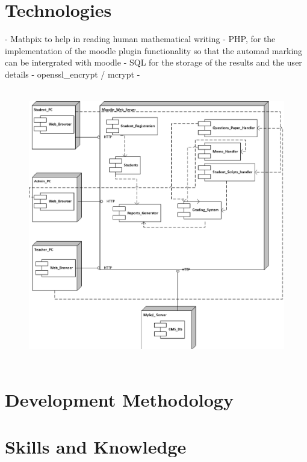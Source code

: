 \documentclass{article}
\begin{document}
\section{Technologies}
  - Mathpix to help in reading human mathematical writing 
  - PHP, for the implementation of the moodle plugin functionality so that the automad marking can be intergrated with moodle
  - SQL for the storage of the results and the user details
  - openssl_encrypt / mcrypt
  - 
\begin{figure}[h]
\centering
\includegraphics[width=12cm, height=12cm]{Caracal_Deployment_Diagram.eps} 
\end{figure}

\section{Development Methodology}

\section{Skills and Knowledge}
\end{document}
